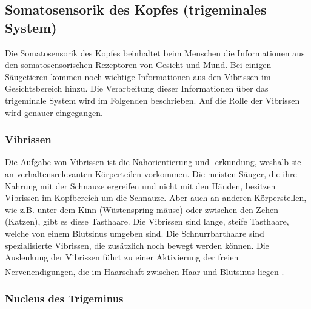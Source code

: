 \subsection{Somatosensorik des Kopfes (trigeminales System) }
\label{sec:somatokopf}
Die Somatosensorik des Kopfes beinhaltet beim Menschen die Informationen aus den somatosensorischen Rezeptoren von Gesicht und Mund. Bei einigen Säugetieren kommen noch wichtige Informationen aus den Vibrissen im Gesichtsbereich hinzu. Die Verarbeitung dieser Informationen über das trigeminale System wird im Folgenden beschrieben. Auf die Rolle der Vibrissen wird genauer eingegangen.

\subsubsection*{Vibrissen}
Die Aufgabe von Vibrissen ist die Nahorientierung und -erkundung, weshalb sie an verhaltensrelevanten Körperteilen vorkommen. Die meisten Säuger, die ihre Nahrung mit der Schnauze ergreifen und nicht mit den Händen, besitzen Vibrissen im Kopfbereich um die Schnauze. Aber auch an anderen Körperstellen, wie z.B. unter dem Kinn (Wüstenspring-mäuse) oder zwischen den Zehen (Katzen), gibt es diese Tasthaare. Die Vibrissen sind lange, steife Tasthaare, welche von einem Blutsinus umgeben sind. Die Schnurrbarthaare  sind spezialisierte Vibrissen, die zusätzlich noch bewegt werden können. 
Die Auslenkung der Vibrissen führt zu einer Aktivierung der freien Nervenendigungen, die im Haarschaft zwischen Haar und Blutsinus liegen \textsuperscript{\cite[Kap.~5]{heldmaier2003tierphysiologie}}.

\subsubsection*{Nucleus des Trigeminus}

